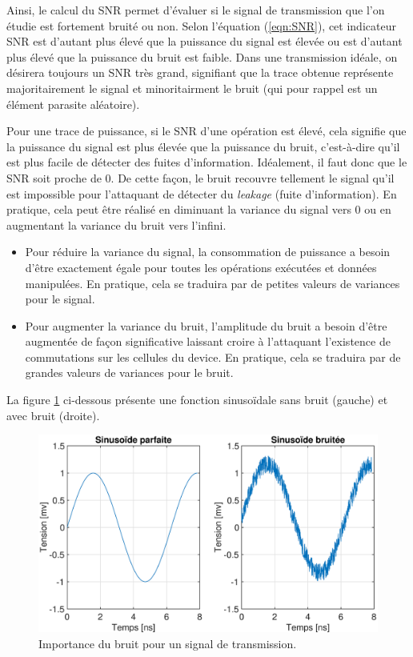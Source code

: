 \documentclass[oneside]{book}
\begin{document}
\vspace{-0.4 cm}\hspace{-0.5 cm}Ainsi, le calcul du SNR permet d'évaluer si le signal de transmission que l'on étudie est fortement bruité ou non. Selon l'équation (\ref{eqn:SNR}), cet indicateur SNR est d'autant plus élevé que la puissance du signal est élevée ou est d'autant plus élevé que la puissance du bruit est faible. Dans une transmission idéale, on désirera toujours un SNR très grand, signifiant que la trace obtenue représente majoritairement le signal et minoritairment le bruit (qui pour rappel est un élément parasite aléatoire).

\hspace{-0.5 cm}Pour une trace de puissance, si le SNR d'une opération est élevé, cela signifie que la puissance du signal est plus élevée que la puissance du bruit, c'est-à-dire qu'il est plus facile de détecter des fuites d'information. Idéalement, il faut donc que le SNR soit proche de 0. De cette façon, le bruit recouvre tellement le signal qu'il est impossible pour l'attaquant de détecter du \textit{leakage} (fuite d'information). En pratique, cela peut être réalisé en diminuant la variance du signal vers 0 ou en augmentant la variance du bruit vers l'infini.
\begin{itemize}
\item Pour réduire la variance du signal, la consommation de puissance a besoin d'être exactement égale pour toutes les opérations exécutées et données manipulées. En pratique, cela se traduira par de petites valeurs de variances pour le signal.
\item Pour augmenter la variance du bruit, l'amplitude du bruit a besoin d'être augmentée de façon significative laissant croire à l'attaquant l'existence de commutations sur les cellules du device. En pratique, cela se traduira par de grandes valeurs de variances pour le bruit.
\end{itemize}

\hspace{-0.5 cm}La figure \ref{fig:SNR_Fig} ci-dessous présente une fonction sinusoïdale sans bruit (gauche) et avec bruit (droite). 
\begin{figure}[htbp]
    \centering
    \includegraphics[scale=0.2]{image/SNR_Fig}
    \caption{Importance du bruit pour un signal de transmission.}
    \label{fig:SNR_Fig}
\end{figure}
\end{document}
